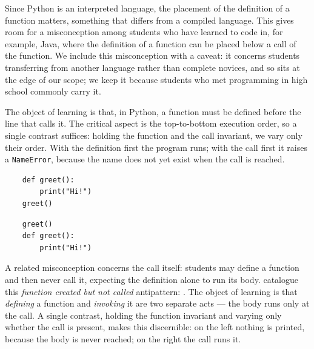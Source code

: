 Since Python is an interpreted language, the placement of the definition of
a function matters, something that differs from a compiled language. This gives
room for a misconception among students who have learned to code in, for
example, Java, where the definition of a function can be placed below a call of
the function. We include this misconception with a caveat: it concerns students
transferring from another language rather than complete novices, and so sits at
the edge of our scope; we keep it because students who met programming in high
school commonly carry it.

The object of learning is that, in Python, a function must be defined before the
line that calls it. The critical aspect is the top-to-bottom execution order, so
a single contrast suffices: holding the function and the call invariant, we vary
only their order. With the definition first the program runs; with the call
first it raises a \texttt{NameError}, because the name does not yet
exist when the call is reached.

\hfill
\begin{minipage}[t]{0.45\columnwidth}
  \begin{verbatim}
    def greet():
        print("Hi!")
    greet()
  \end{verbatim}
\end{minipage}
\hfill
\begin{minipage}[t]{0.45\columnwidth}
  \begin{verbatim}
    greet()
    def greet():
        print("Hi!")
  \end{verbatim}
\end{minipage}

A related misconception concerns the call itself: students may define a function
and then never call it, expecting the definition alone to run its
body.\label{defined-not-called}
\textcite{Bosse2021Antipatterns} catalogue this \emph{function created but not
called} antipattern: . The object of learning is that \emph{defining} a function and
\emph{invoking} it are two separate acts --- the body runs only at the call. A
single contrast, holding the function invariant and varying only whether the call
is present, makes this discernible: on the left nothing is printed, because the
body is never reached; on the right the call runs it.


